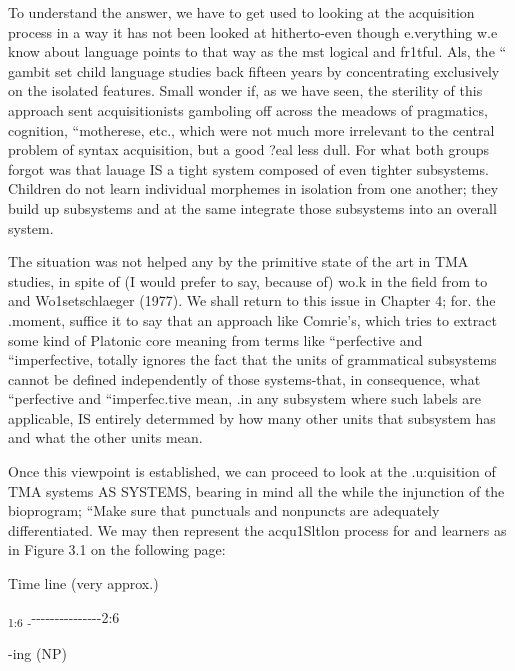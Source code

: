 To understand the answer, we have to get used to looking at the
acquisition process in a way it has not been looked at hitherto-even though e.verything w.e know about language points to that way as the mst logical and fr1tful. Als, the `` gambit set child language studies back fifteen years by concentrating exclusively on the  isolated features. Small wonder if, as we have seen, the sterility of this approach sent acquisitionists gamboling off across the meadows of pragmatics, cognition, ``motherese, etc., which were not much more irrelevant to the central problem of syntax acquisition, but a good ?eal less dull. For what both groups forgot was that lauage IS a tight system composed of even tighter sub\-systems. Children do not learn individual morphemes in isolation from
one another; they build up subsystems and at the same  integrate those subsystems into an overall system.

The situation was not helped any by the primitive state of the art in TMA studies, in spite of (I would prefer to say, because of) wo.k in the field from \citet{Reichenbach1947} to \citet{Comrie1976} and Wo1setschlaeger (1977). We shall return to this issue in Chapter 4; for. the .moment, suffice it to say that an approach like Comrie's,
which tries to extract some kind of Platonic core meaning from terms like ``perfective and ``imperfective, totally ignores the fact that the units of grammatical subsystems cannot be defined independently of those systems-that, in consequence, what ``perfective and ``im\-perfec.tive mean, .in any subsystem where such labels are applicable,
IS entirely determmed by how many other units that subsystem has and what the other units mean.

Once this viewpoint is established, we can proceed to look at the .u:quisition of TMA systems AS SYSTEMS, bearing in mind all the while the injunction of the bioprogram; ``Make sure that punctuals and nonpuncts are adequately differentiated. We may then repre\-sent the acqu1Sltlon process for  and  learners as in Figure
3.1 on the following page:

Time line (very approx.)

\textsubscript{1}\textsubscript{:6 }\textsubscript{{}-}{}-{}-{}-{}-{}-{}-{}-{}-{}-{}-{}-{}-{}-{}-{}-2:6

{}-ing (NP)

